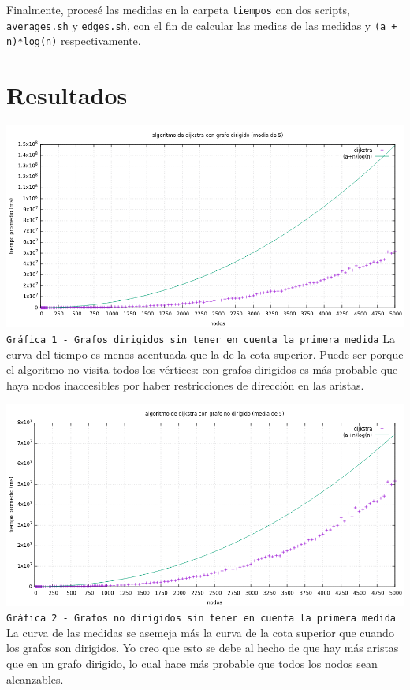 \documentclass[12pt , a4paper]{article}
\begin{document}
	Finalmente, procesé las medidas en la carpeta \texttt{tiempos} con dos scripts, \texttt{averages.sh} y \texttt{edges.sh}, con el fin de calcular las medias de las medidas y \texttt{(a + n)*log(n)} respectivamente.


\section{Resultados}

	\hspace*{-.15\linewidth}
	\includegraphics[width=1.25\hsize]{dir5.png}
	\texttt{Gráfica 1 - Grafos dirigidos sin tener en cuenta la primera medida}
	La curva del tiempo es menos acentuada que la de la cota superior. Puede ser porque el algoritmo no visita todos los vértices: con grafos dirigidos es más probable que haya nodos inaccesibles por haber restricciones de dirección en las aristas.
	
	
	\newpage
	\hspace*{-.15\linewidth}
	\includegraphics[width=1.25\hsize]{nodir5.png}
	\texttt{Gráfica 2 - Grafos no dirigidos sin tener en cuenta la primera medida}
	La curva de las medidas se asemeja más la curva de la cota superior que cuando los grafos son dirigidos. Yo creo que esto se debe al hecho de que hay más aristas que en un grafo dirigido, lo cual hace más probable que todos los nodos sean alcanzables. 
\end{document}
